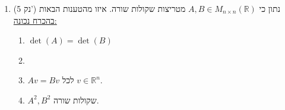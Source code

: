\documentclass[12pt, a4paper]{article}
\newcommand{\ntn}{n\times n}
\newcommand{\rr}{\mathbb{R}}
\newcommand{\points}[1]{(#1 נק') }
\begin{document}
\begin{enumerate}
\underline{פתרון:}
נשתמש בהגדרה של וקטור קורדינטות ונפשט את הנתונים:
\begin{align*}
\begin{pmatrix}
    1\\0\\
\end{pmatrix}=1\cdot v_1+3\cdot v_2\quad ,\quad\begin{pmatrix}
    0\\1\\
\end{pmatrix}=2\cdot v_1+5\cdot v_2
\end{align*}
מכאן ניתן למצוא את שני הוקטורים, למשל על ידי
\begin{align*}
    \begin{pmatrix}
        0\\1\\
    \end{pmatrix}
    -2\begin{pmatrix}
        1\\0\\
    \end{pmatrix}=(2v_1+5v_2)-2(v_1+3v_2)=-v_2
\end{align*}
לכן
$v_2=\begin{pmatrix}
    2\\-1\\
\end{pmatrix}$
ואז
$v_1=\begin{pmatrix}
    1\\0\\
\end{pmatrix}-3\begin{pmatrix}
    2\\-1\\
\end{pmatrix}=\begin{pmatrix}
    -5\\3
\end{pmatrix}$
לסיכום נקבל כי
$v_1+v_2=\begin{pmatrix}
    -3\\2\\
\end{pmatrix}$.

\noindent\rule{16cm}{0.4pt}

\item\points{5}
נתון כי
$A,B\in M_{\ntn}(\rr)$
מטריצות שקולות שורה.
איזו מהטענות הבאות 
\underline{ בהכרח נכונה:}
\begin{enumerate}
\item
$\det(A)=\det(B)$
\item
{}
\item
$Av=Bv$
לכל
$v\in\rr^n$.
\item
$A^2,B^2$
שקולות שורה.
\end{enumerate}


\end{enumerate}
\end{document}
